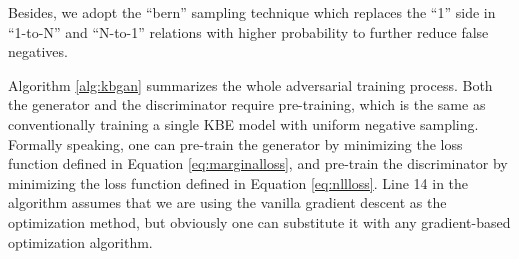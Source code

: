 \documentclass[11pt,a4paper]{article}
\begin{document}
Besides, we adopt the ``bern'' sampling technique \cite{wang2014knowledge} which replaces the ``1'' side in ``1-to-N'' and ``N-to-1'' relations with higher probability to further reduce false negatives.

Algorithm \ref{alg:kbgan} summarizes the whole adversarial training process. Both the generator and the discriminator require pre-training, which is the same as conventionally training a single KBE model with uniform negative sampling. Formally speaking, one can pre-train the generator by minimizing the loss function defined in Equation \eqref{eq:marginalloss}, and pre-train the discriminator by minimizing the loss function defined in Equation \eqref{eq:nllloss}. Line 14 in the algorithm assumes that we are using the vanilla gradient descent as the optimization method, but obviously one can substitute it with any gradient-based optimization algorithm.
\end{document}
